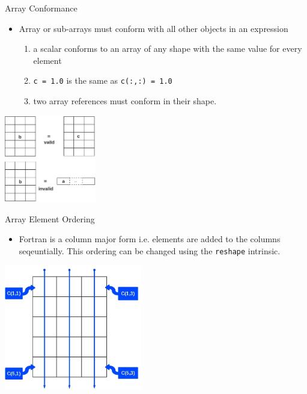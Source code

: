 \documentclass[c,mathserif,compress,xcolor=svgnames]{beamer}
\newcommand{\lstfortran}[1]{\lstinline[language={[90]Fortran},basicstyle=\footnotesize\ttfamily]|#1|}
\begin{document}
\begin{frame}{Array Conformance}
  \begin{itemize}
    \item Array or sub-arrays must conform with all other objects in an expression
      \begin{enumerate}
        \item a scalar conforms to an array of any shape with the same value for every element
        \item[] \lstfortran{c = 1.0} is the same as \lstfortran{c(:,:) = 1.0}
        \item two array references must conform in their shape.
      \end{enumerate}
  \end{itemize}
  \begin{center}
    \includegraphics[width=4cm]{./graphics/array4}
  \end{center}
\end{frame}

\begin{frame}{Array Element Ordering}
  \begin{itemize}
    \item Fortran is a column major form i.e. elements are added to the columns seqeuntially. This ordering can be changed using the \lstfortran{reshape} intrinsic.
  \end{itemize}
  \begin{center}
    \includegraphics[width=6cm,clip=true]{./graphics/array5}
  \end{center}
\end{frame}
\end{document}
